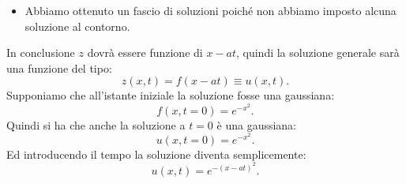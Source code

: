 \begin{appendices}
\begin{exmp}
\begin{itemize}
       \item Abbiamo ottenuto un fascio di soluzioni poiché non abbiamo imposto alcuna soluzione al contorno.
   \end{itemize}
   In conclusione $z$ dovrà essere funzione di $x-at$, quindi la soluzione generale sarà una funzione del tipo:
   \[
       z(x, t ) = f(x-at) \equiv u(x, t) 
   .\] 
   Supponiamo che all'istante iniziale la soluzione fosse una gaussiana:
   \[
       f(x, t=0) = e^{-x^2}
   .\] 
   Quindi si ha che anche la soluzione a $t=0$ è una gaussiana:
   \[
       u(x, t=0) = e^{-x^2}
   .\] 
   Ed introducendo il tempo la soluzione diventa semplicemente:
   \[
       u(x, t) = e^{-\left(x-at\right)^2}
   .\] 
   
\end{exmp}
\noindent

\end{appendices}

\renewcommand{\thesubsection}{\arabic{section}.\arabic{subsection}}

